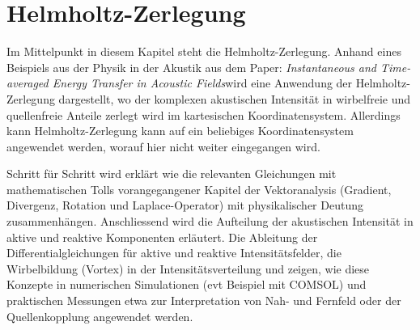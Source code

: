 %
%
%
%
\chapter{Helmholtz-Zerlegung\label{chapter:helmholtz}}
\begin{refsection}

Im Mittelpunkt in diesem Kapitel steht die Helmholtz-Zerlegung. Anhand eines Beispiels aus der Physik in der Akustik aus dem Paper: \glqq \textit{Instantaneous and Time-averaged Energy Transfer in Acoustic Fields}\grqq wird eine Anwendung der Helmholtz-Zerlegung dargestellt, wo der komplexen akustischen Intensität in wirbelfreie und quellenfreie Anteile zerlegt wird im kartesischen Koordinatensystem. Allerdings kann Helmholtz-Zerlegung kann auf ein beliebiges Koordinatensystem angewendet werden, worauf hier nicht weiter eingegangen wird. \newline


Schritt für Schritt wird erklärt wie die relevanten Gleichungen mit mathematischen Tolls vorangegangener Kapitel der Vektoranalysis (Gradient, Divergenz, Rotation und Laplace-Operator) mit physikalischer Deutung zusammenhängen. Anschliessend wird die Aufteilung der akustischen Intensität in aktive und reaktive Komponenten erläutert. Die Ableitung der Differentialgleichungen für aktive und reaktive Intensitätsfelder, die Wirbelbildung (Vortex) in der Intensitätsverteilung und zeigen, wie diese Konzepte in numerischen Simulationen (evt Beispiel mit COMSOL) und praktischen Messungen etwa zur Interpretation von Nah- und Fernfeld oder der Quellenkopplung angewendet werden.








\printbibliography[heading=subbibliography]
\end{refsection}
